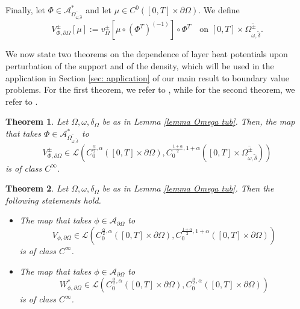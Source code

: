 \documentclass[11pt,reqno,a4paper]{amsart}
\theoremstyle{plain}
\newtheorem{theorem}{Theorem}[section]
\theoremstyle{definition}
\begin{document}
Finally, let $\Phi \in \mathcal{A}^*_{\overline{\Omega_{\omega,\tilde{\delta}}}}$ and let $\mu \in C^0([0,T] \times \partial\Omega)$. We define 
\begin{equation*}
     V^{\pm}_{\Phi,\partial\Omega}[\mu] := v^{\pm}_{\Omega}[\mu \circ (\Phi^T)^{(-1)}] \circ \Phi^T \quad \text{on } [0, T] \times \overline{\Omega^\pm_{\omega,\tilde{\delta}}}.
\end{equation*}

We now state two theorems on the dependence of layer heat potentials upon perturbation of the support and of the density, which will be used in the application in Section \ref{sec: application} of our main result to boundary value problems. For the first theorem, we refer to \cite[Thm.\,5.3]{DaLu23}, while for the second theorem, we refer to \cite[Thm.\,5.4]{DaLu23}.

\begin{theorem}\label{thm dependence V Phi W Phi}
    Let $\Omega, \omega,\delta_{\Omega}$ be as in Lemma \ref{lemma Omega tub}. Then, the map that takes $\Phi \in \mathcal{A}^*_{\overline{\Omega_{\omega,\tilde{\delta}}}}$ to 
    \begin{equation*}
        V_{\Phi,\partial\Omega}^{\pm} \in \mathcal{L} \left( C^{\frac{\alpha}{2}, \alpha}_0([0,T] \times \partial\Omega), C^{\frac{1+\alpha}{2}, 1+\alpha}_0([0,T] \times \overline{\Omega^{\pm}_{\omega,\tilde{\delta}}}) \right)
    \end{equation*}
    is of class $C^\infty$.
\end{theorem}

\begin{theorem}\label{thm dependence V phi W phi}
    Let $\Omega, \omega,\delta_{\Omega}$ be as in Lemma \ref{lemma Omega tub}. Then the following statements hold. 
    \begin{itemize}
        \item[(i)] The map that takes $\phi \in \mathcal{A}_{\partial \Omega}$ to 
        \begin{equation*}
            V_{\phi,\partial\Omega} \in \mathcal{L} \left( C^{\frac{\alpha}{2}, \alpha}_0([0,T] \times \partial\Omega), C^{\frac{1+\alpha}{2}, 1+\alpha}_0([0,T] \times \partial\Omega) \right)
        \end{equation*}
        is of class $C^\infty$.  

        \item[(ii)] The map that takes $\phi \in \mathcal{A}_{\partial \Omega}$ to 
        \begin{equation*}
            W^\ast_{\phi,\partial\Omega} \in \mathcal{L} \left( C^{\frac{\alpha}{2}, \alpha}_0([0,T] \times \partial\Omega), C^{\frac{\alpha}{2}, \alpha}_0([0,T] \times \partial\Omega) \right)
        \end{equation*}
        is of class $C^\infty$.   
    \end{itemize}
\end{theorem}
\end{document}
